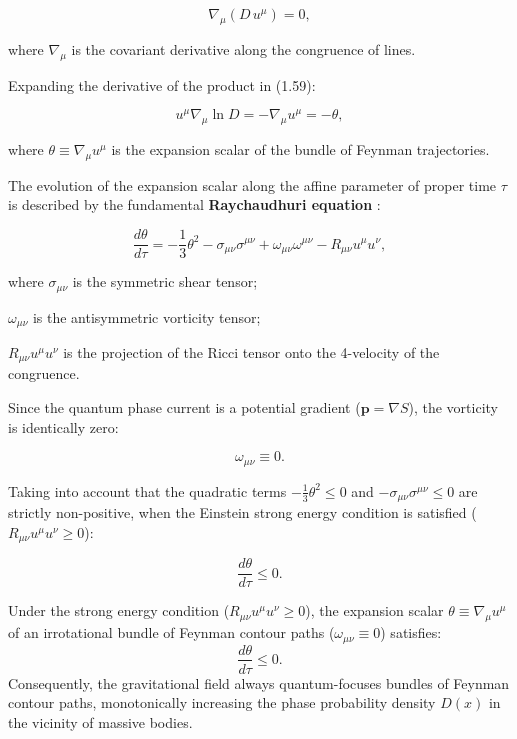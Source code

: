 \begin{equation}\label{eq:1.59}\tag{1.59}
\nabla_\mu \left( D \, u^\mu \right) = 0,
\end{equation}

where $\nabla_\mu$ is the covariant derivative along the congruence of lines.

Expanding the derivative of the product in (1.59):

\begin{equation}\label{eq:1.60}\tag{1.60}
u^\mu \nabla_\mu \ln D = -\nabla_\mu u^\mu = -\theta,
\end{equation}

where $\theta \equiv \nabla_\mu u^\mu$ is the expansion scalar of the bundle of Feynman trajectories.

The evolution of the expansion scalar along the affine parameter of proper time $\tau$ is described by the fundamental \textbf{Raychaudhuri equation} \cite{ref10}:

\begin{equation}\label{eq:1.61}\tag{1.61}
\frac{d\theta}{d\tau} = -\frac{1}{3}\theta^2 - \sigma_{\mu\nu}\sigma^{\mu\nu} + \omega_{\mu\nu}\omega^{\mu\nu} - R_{\mu\nu} u^\mu u^\nu,
\end{equation}

where $\sigma_{\mu\nu}$ is the symmetric shear tensor;  

$\omega_{\mu\nu}$ is the antisymmetric vorticity tensor;  

$R_{\mu\nu} u^\mu u^\nu$ is the projection of the Ricci tensor onto the 4-velocity of the congruence.

Since the quantum phase current is a potential gradient ($\mathbf{p} = \nabla S$), the vorticity is identically zero:

\begin{equation}\label{eq:1.62}\tag{1.62}
\omega_{\mu\nu} \equiv 0.
\end{equation}

Taking into account that the quadratic terms $-\frac{1}{3}\theta^2 \le 0$ and $-\sigma_{\mu\nu}\sigma^{\mu\nu} \le 0$ are strictly non-positive, when the Einstein strong energy condition is satisfied ($R_{\mu\nu} u^\mu u^\nu \ge 0$):

\begin{equation}\label{eq:1.63}\tag{1.63}
\frac{d\theta}{d\tau} \le 0.
\end{equation}

\begin{theorem}\label{thm:raychaudhuri}
Under the strong energy condition ($R_{\mu\nu} u^\mu u^\nu \ge 0$), the expansion scalar $\theta \equiv \nabla_\mu u^\mu$ of an irrotational bundle of Feynman contour paths ($\omega_{\mu\nu} \equiv 0$) satisfies:
\begin{equation*}
\frac{d\theta}{d\tau} \le 0.
\end{equation*}
Consequently, the gravitational field always quantum-focuses bundles of Feynman contour paths, monotonically increasing the phase probability density $D(x)$ in the vicinity of massive bodies.
\end{theorem}

